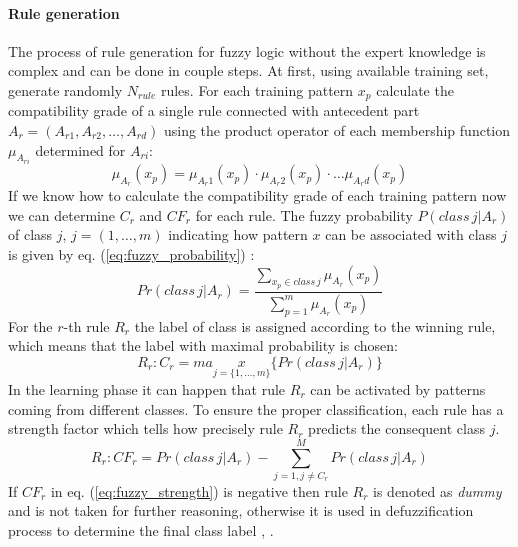 \paragraph{Rule generation}
\label{cha:Fuzzy_logic_rule_generation}
The process of rule generation for fuzzy logic without the expert knowledge is
complex and can be done in couple steps. At first, using available
training set, generate randomly $N_{rule}$ rules. For
each training pattern $x_p$ calculate the compatibility grade of a single rule
connected with antecedent part $A_r = (A_{r1}, A_{r2}, \ldots, A_{rd})$ using
the product operator of each membership function $\mu_{A_{ri}}$ determined for
$A_{ri}$:
\begin{equation}
    \mu_{A_r}(x_p)=\mu_{A_r1}(x_p)\cdot\mu_{A_r2}(x_p)\cdot\ldots\mu_{A_rd}(x_p)
    \label{eq:mu_product}
\end{equation}
If we know how to calculate the compatibility grade of each training pattern
now we can determine $C_r$ and $CF_r$ for each rule. The fuzzy probability
$P(class\, j|A_r)$ of class $j$, $j=(1, \ldots, m)$ indicating how pattern $x$ can be associated with class $j$ 
is given by eq. (\ref{eq:fuzzy_probability}) \cite{bib30}:
\begin{equation}
    Pr(class \, j|A_r) = \frac{\sum\limits_{x_p \in class\,
    j}\mu_{A_r}(x_p)}{\sum\limits_{p=1}^m\mu_{A_r}(x_p)}
    \label{eq:fuzzy_probability}
\end{equation}
For the $r$-th rule $R_r$ the label of class is assigned according to the
winning rule, which means that the label with maximal probability is chosen:
\begin{equation}
    R_r: C_r = max\limits_{j=\{1, \ldots, m\}}\{Pr(class\,j|A_r)\}
    \label{eq:fuzzy_max}
\end{equation}
In the learning phase it can happen that rule $R_r$ can be activated by
patterns coming from different classes. To ensure the proper classification, each
rule has a strength factor which tells how precisely rule $R_r$ predicts the
consequent class $j$.
\begin{equation}
    R_r: CF_r=Pr(class\, j|A_r) - \sum\limits_{j=1, j\neq C_r}^MPr(class\,j|A_r)
    \label{eq:fuzzy_strength}
\end{equation}
If $CF_r$ in eq. (\ref{eq:fuzzy_strength}) is negative then rule $R_r$ is
denoted as \textit{dummy} and is not taken for further reasoning, otherwise it is used in
defuzzification process to determine the final class label \cite{bib18}, \cite{bib26}.
